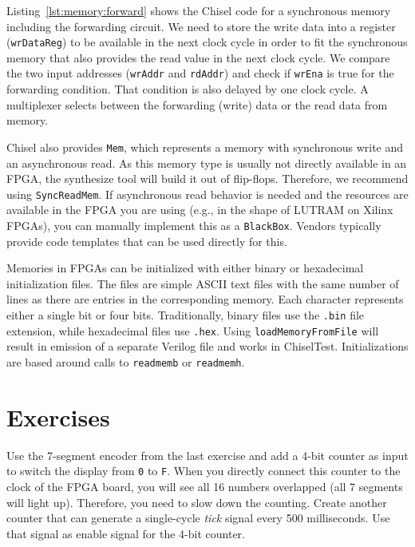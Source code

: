 \documentclass[%
    10pt,
    headinclude, footexclude,
    openright, %
    notitlepage,
    cleardoubleempty,
    headsepline,
    pointlessnumbers,
    bibtotoc, idxtotoc,
    ]{scrbook}
\newcommand{\code}[1]{{\small{\texttt{#1}}}}
\begin{document}
Listing~\ref{lst:memory:forward} shows the Chisel code for a synchronous memory
including the forwarding circuit. We need to store the write data into a register
(\code{wrDataReg}) to be available in the next clock cycle in order to fit
the synchronous memory that also provides the read value in the next clock
cycle.
We compare the two input addresses (\code{wrAddr} and \code{rdAddr})
and check if \code{wrEna} is true for the forwarding condition.
That condition is also delayed by one clock cycle.
A multiplexer selects between the forwarding (write) data or the read
data from memory.


Chisel also provides \code{Mem}, which represents a memory with synchronous
write and an asynchronous read. As this memory type is usually not directly available
in an FPGA, the synthesize tool will build it out of flip-flops.
Therefore, we recommend using \code{SyncReadMem}. If asynchronous read behavior is needed and
the resources are available in the FPGA you are using (e.g., in the shape of LUTRAM on Xilinx
FPGAs), you can manually implement this as a \code{BlackBox}. Vendors typically provide
code templates that can be used directly for this.


Memories in FPGAs can be initialized with either binary or hexadecimal initialization files.
The files are simple ASCII text files with the same number of lines as there are
entries in the corresponding memory. Each character represents either a single bit
or four bits. Traditionally, binary files use the \code{.bin} file extension, while
hexadecimal files use \code{.hex}. Using \code{loadMemoryFromFile} will result in
emission of a separate Verilog file and works in ChiselTest.
Initializations are based around calls to \code{readmemb} or \code{readmemh}.

\section{Exercises}

Use the 7-segment encoder from the last exercise and add a 4-bit counter as input
to switch the display from \code{0} to \code{F}. When you directly connect this
counter to the clock of the FPGA board, you will see all 16 numbers
overlapped (all 7 segments will light up).
Therefore, you need to slow down the counting. Create another
counter that can generate a single-cycle \emph{tick} signal every 500 milliseconds.
Use that signal as enable signal for the 4-bit counter.
\end{document}
